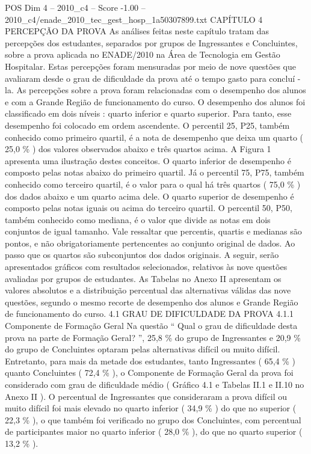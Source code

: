\begin{textsample}{POS Dim 4 – 2010\_c4 – Score -1.00 – 2010\_c4/enade\_2010\_tec\_gest\_hosp\_1a50307899.txt}  \label{ex:f4_pos_296}
CAPÍTULO 4 PERCEPÇÃO DA PROVA As análises feitas neste capítulo tratam das percepções dos estudantes, separados por grupos de Ingressantes e Concluintes, sobre a prova aplicada no ENADE/2010 na Área de Tecnologia em Gestão Hospitalar.
Estas percepções foram mensuradas por meio de nove questões que avaliaram desde o grau de dificuldade da prova até o tempo gasto para concluí -la.
As percepções sobre a prova foram relacionadas com o desempenho dos alunos e com a Grande Região de funcionamento do curso.
O desempenho dos alunos foi classificado em dois níveis : quarto inferior e quarto superior.
Para tanto, esse desempenho foi colocado em ordem ascendente.
O percentil 25, P25, também conhecido como primeiro quartil, é a nota de desempenho que deixa um quarto ( 25,0 \% ) dos valores observados abaixo e três quartos acima.
A Figura 1 apresenta uma ilustração destes conceitos.
O quarto inferior de desempenho é composto pelas notas abaixo do primeiro quartil.
Já o percentil 75, P75, também conhecido como terceiro quartil, é o valor para o qual há três quartos ( 75,0 \% ) dos dados abaixo e um quarto acima dele.
O quarto superior de desempenho é composto pelas notas iguais ou acima do terceiro quartil.
O percentil 50, P50, também conhecido como mediana, é o valor que divide as notas em dois conjuntos de igual tamanho.
Vale ressaltar que percentis, quartis e medianas são pontos, e não obrigatoriamente pertencentes ao conjunto original de dados.
Ao passo que os quartos são subconjuntos dos dados originais.
A seguir, serão apresentados gráficos com resultados selecionados, relativos às nove questões avaliadas por grupos de estudantes.
As Tabelas no Anexo II apresentam os valores absolutos e a distribuição percentual das alternativas válidas das nove questões, segundo o mesmo recorte de desempenho dos alunos e Grande Região de funcionamento do curso. 4.1 GRAU DE DIFICULDADE DA PROVA 4.1.1 Componente de Formação Geral Na questão “ Qual o grau de dificuldade desta prova na parte de Formação Geral? ”, 25,8 \% do grupo de Ingressantes e 20,9 \% do grupo de Concluintes optaram pelas alternativas difícil ou muito difícil.
Entretanto, para mais da metade dos estudantes, tanto Ingressantes ( 65,4 \% ) quanto Concluintes ( 72,4 \% ), o Componente de Formação Geral da prova foi considerado com grau de dificuldade médio ( Gráfico 4.1 e Tabelas II.1 e II.10 no Anexo II ).
O percentual de Ingressantes que consideraram a prova difícil ou muito difícil foi mais elevado no quarto inferior ( 34,9 \% ) do que no superior ( 22,3 \% ), o que também foi verificado no grupo dos Concluintes, com percentual de participantes maior no quarto inferior ( 28,0 \% ), do que no quarto superior ( 13,2 \% ).

\end{textsample}

